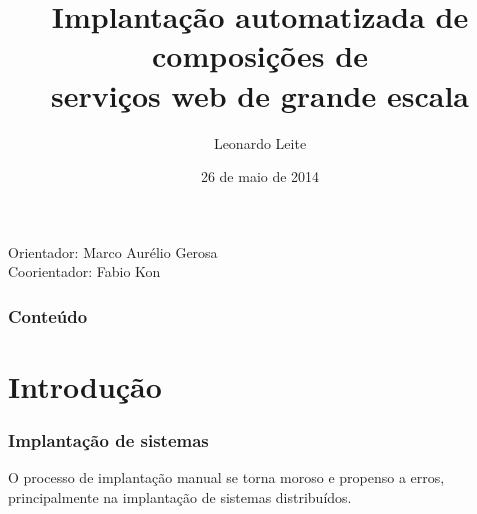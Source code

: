 \documentclass{beamer}
\title[Defesa mestrado]{Implantação automatizada de composições de \\ serviços web de grande escala} %
\author{Leonardo Leite} %
\institute[IME - USP] %
{
IME - USP \\ %
\medskip
}
\date{26 de maio de 2014} %
\newcommand\frase[1]{\begin{center}\large#1\end{center}}
\begin{document}
\begin{frame}
\titlepage %
\begin{center}
{\scriptsize
Orientador: Marco Aurélio Gerosa \\
Coorientador: Fabio Kon
}
\end{center}
\end{frame}

\begin{frame}
\frametitle{Conteúdo} %
\tableofcontents %
\end{frame}


\section{Introdução} %




\begin{frame}
\frametitle{Implantação de sistemas}

\frase{O processo de implantação manual se torna moroso e propenso a erros,
principalmente na implantação de sistemas distribuídos.}

\end{frame}
\end{document}
